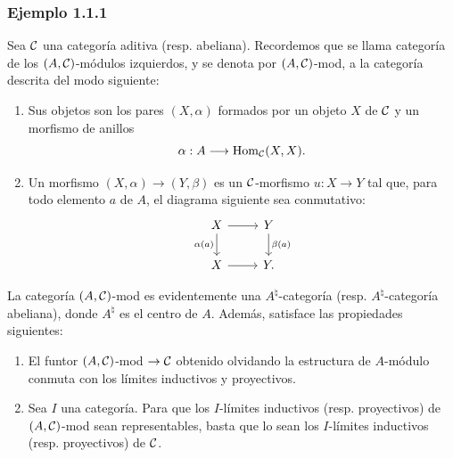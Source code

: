 \subsubsection*{Ejemplo 1.1.1}
Sea $\mathcal C$ una categoría aditiva (resp. abeliana). Recordemos que se llama categoría de los $(A,\mathcal C)$-módulos izquierdos, y se denota por $(A,\mathcal C)$-mod, a la categoría descrita del modo siguiente:
\begin{enumerate}[label=(\roman*)]
\item Sus objetos son los pares $(X,\alpha)$ formados por un objeto $X$ de $\mathcal C$ y un morfismo de anillos
\[
\alpha:A\longrightarrow \operatorname{Hom}_{\mathcal C}(X,X).
\]
\item Un morfismo $(X,\alpha)\to(Y,\beta)$ es un $\mathcal C$-morfismo $u:X\to Y$ tal que, para todo elemento $a$ de $A$, el diagrama siguiente sea conmutativo:
\[
\begin{tikzcd}
X \arrow[r] \arrow[d,"\alpha(a)"'] & Y \arrow[d,"\beta(a)"]\\
X \arrow[r] & Y .
\end{tikzcd}
\]
\end{enumerate}
La categoría $(A,\mathcal C)$-mod es evidentemente una $A^{\natural}$-categoría (resp. $A^{\natural}$-categoría abeliana), donde $A^{\natural}$ es el centro de $A$. Además, satisface las propiedades siguientes:
\begin{enumerate}[label=(\alph*)]
\item El funtor $(A,\mathcal C)$-mod $\to\mathcal C$ obtenido olvidando la estructura de $A$-módulo conmuta con los límites inductivos y proyectivos.
\item Sea $I$ una categoría. Para que los $I$-límites inductivos (resp. proyectivos) de $(A,\mathcal C)$-mod sean representables, basta que lo sean los $I$-límites inductivos (resp. proyectivos) de $\mathcal C$.
\end{enumerate}
